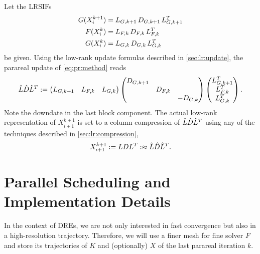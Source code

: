 Let the \acp{LRSIF}
\begin{align}
  G(X^{k+1}_i) &= \mathop{L_{G,k+1}} \mathop{D_{G,k+1}} \mathop{L_{G,k+1}^T} \\
  F(X^k_i)     &= \mathop{L_{F,k}}   \mathop{D_{F,k}}   \mathop{L_{F,k}^T} \\
  G(X^k_i)     &= \mathop{L_{G,k}}   \mathop{D_{G,k}}   \mathop{L_{G,k}^T}
\end{align}
be given.
Using the low-rank update formulas described in \autoref{sec:lr:update},
the parareal update of \eqref{eq:pr:method} reads
\begin{equation}
  \hat L \hat D \hat L^T :=
  \begin{pmatrix}
    L_{G,k+1} &
    L_{F,k} &
    L_{G,k}
  \end{pmatrix}
  \begin{pmatrix}
    D_{G,k+1} \\
    & D_{F,k} \\
    && -D_{G,k}
  \end{pmatrix}
  \begin{pmatrix}
    L_{G,k+1}^T \\
    L_{F,k}^T \\
    L_{G,k}^T
  \end{pmatrix}
  .
\end{equation}
Note the downdate in the last block component.
The actual low-rank representation of $X^{k+1}_{i+1}$ is set to a column compression of $\hat L \hat D \hat L^T$
using any of the techniques described in \autoref{sec:lr:compression},
\begin{equation}
  X^{k+1}_{i+1}
  := LDL^T
  :\approx \hat L \hat D \hat L^T
  .
\end{equation}

\section{Parallel Scheduling and Implementation Details}

In the context of \acp{DRE},
we are not only interested in fast convergence but also in a high-resolution trajectory.
Therefore, we will use a finer mesh for fine solver $F$ and store its trajectories of $K$ and (optionally) $X$ of the last parareal iteration $k$.


